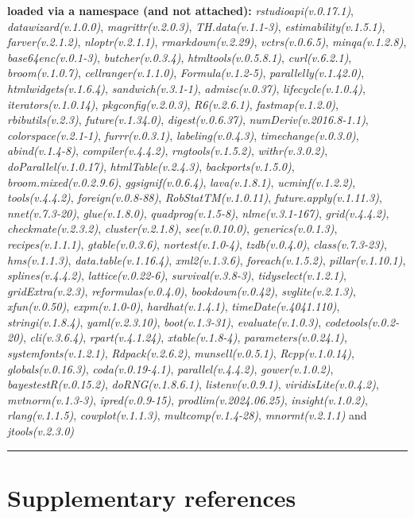 \documentclass[
  bookmarksnumbered]{article}
\begin{document}
\textbf{loaded via a namespace (and not attached):}
\emph{rstudioapi(v.0.17.1)}, \emph{datawizard(v.1.0.0)}, \emph{magrittr(v.2.0.3)}, \emph{TH.data(v.1.1-3)}, \emph{estimability(v.1.5.1)}, \emph{farver(v.2.1.2)}, \emph{nloptr(v.2.1.1)}, \emph{rmarkdown(v.2.29)}, \emph{vctrs(v.0.6.5)}, \emph{minqa(v.1.2.8)}, \emph{base64enc(v.0.1-3)}, \emph{butcher(v.0.3.4)}, \emph{htmltools(v.0.5.8.1)}, \emph{curl(v.6.2.1)}, \emph{broom(v.1.0.7)}, \emph{cellranger(v.1.1.0)}, \emph{Formula(v.1.2-5)}, \emph{parallelly(v.1.42.0)}, \emph{htmlwidgets(v.1.6.4)}, \emph{sandwich(v.3.1-1)}, \emph{admisc(v.0.37)}, \emph{lifecycle(v.1.0.4)}, \emph{iterators(v.1.0.14)}, \emph{pkgconfig(v.2.0.3)}, \emph{R6(v.2.6.1)}, \emph{fastmap(v.1.2.0)}, \emph{rbibutils(v.2.3)}, \emph{future(v.1.34.0)}, \emph{digest(v.0.6.37)}, \emph{numDeriv(v.2016.8-1.1)}, \emph{colorspace(v.2.1-1)}, \emph{furrr(v.0.3.1)}, \emph{labeling(v.0.4.3)}, \emph{timechange(v.0.3.0)}, \emph{abind(v.1.4-8)}, \emph{compiler(v.4.4.2)}, \emph{rngtools(v.1.5.2)}, \emph{withr(v.3.0.2)}, \emph{doParallel(v.1.0.17)}, \emph{htmlTable(v.2.4.3)}, \emph{backports(v.1.5.0)}, \emph{broom.mixed(v.0.2.9.6)}, \emph{ggsignif(v.0.6.4)}, \emph{lava(v.1.8.1)}, \emph{ucminf(v.1.2.2)}, \emph{tools(v.4.4.2)}, \emph{foreign(v.0.8-88)}, \emph{RobStatTM(v.1.0.11)}, \emph{future.apply(v.1.11.3)}, \emph{nnet(v.7.3-20)}, \emph{glue(v.1.8.0)}, \emph{quadprog(v.1.5-8)}, \emph{nlme(v.3.1-167)}, \emph{grid(v.4.4.2)}, \emph{checkmate(v.2.3.2)}, \emph{cluster(v.2.1.8)}, \emph{see(v.0.10.0)}, \emph{generics(v.0.1.3)}, \emph{recipes(v.1.1.1)}, \emph{gtable(v.0.3.6)}, \emph{nortest(v.1.0-4)}, \emph{tzdb(v.0.4.0)}, \emph{class(v.7.3-23)}, \emph{hms(v.1.1.3)}, \emph{data.table(v.1.16.4)}, \emph{xml2(v.1.3.6)}, \emph{foreach(v.1.5.2)}, \emph{pillar(v.1.10.1)}, \emph{splines(v.4.4.2)}, \emph{lattice(v.0.22-6)}, \emph{survival(v.3.8-3)}, \emph{tidyselect(v.1.2.1)}, \emph{gridExtra(v.2.3)}, \emph{reformulas(v.0.4.0)}, \emph{bookdown(v.0.42)}, \emph{svglite(v.2.1.3)}, \emph{xfun(v.0.50)}, \emph{expm(v.1.0-0)}, \emph{hardhat(v.1.4.1)}, \emph{timeDate(v.4041.110)}, \emph{stringi(v.1.8.4)}, \emph{yaml(v.2.3.10)}, \emph{boot(v.1.3-31)}, \emph{evaluate(v.1.0.3)}, \emph{codetools(v.0.2-20)}, \emph{cli(v.3.6.4)}, \emph{rpart(v.4.1.24)}, \emph{xtable(v.1.8-4)}, \emph{parameters(v.0.24.1)}, \emph{systemfonts(v.1.2.1)}, \emph{Rdpack(v.2.6.2)}, \emph{munsell(v.0.5.1)}, \emph{Rcpp(v.1.0.14)}, \emph{globals(v.0.16.3)}, \emph{coda(v.0.19-4.1)}, \emph{parallel(v.4.4.2)}, \emph{gower(v.1.0.2)}, \emph{bayestestR(v.0.15.2)}, \emph{doRNG(v.1.8.6.1)}, \emph{listenv(v.0.9.1)}, \emph{viridisLite(v.0.4.2)}, \emph{mvtnorm(v.1.3-3)}, \emph{ipred(v.0.9-15)}, \emph{prodlim(v.2024.06.25)}, \emph{insight(v.1.0.2)}, \emph{rlang(v.1.1.5)}, \emph{cowplot(v.1.1.3)}, \emph{multcomp(v.1.4-28)}, \emph{mnormt(v.2.1.1)} and \emph{jtools(v.2.3.0)}

\begin{center}\rule{0.5\linewidth}{0.5pt}\end{center}

\section{Supplementary references}\label{refs}

\begin{multicols}{2}
\AtNextBibliography{\footnotesize}
\printbibliography[heading=none]
\normalsize
\end{multicols}

\def\printbibliography{}

\printbibliography
\end{document}
